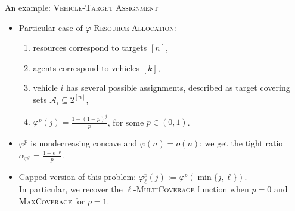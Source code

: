 \documentclass{beamer}
\theoremstyle{definition}
\theoremstyle{remark}
\begin{document}
\begin{frame}{An example: \textsc{Vehicle-Target Assignment}~\cite{Murphey00}}
  \begin{itemize}
  \item Particular case of $\varphi$-\textsc{Resource Allocation}:
    \begin{enumerate}
    \item resources correspond to targets $[n]$,
    \item agents correspond to vehicles $[k]$,
    \item vehicle $i$ has several possible assignments, described as target covering sets $\mathcal{A}_i \subseteq 2^{[n]}$,
    \item $\varphi^p(j) = \frac{1-(1-p)^j}{p}$, for some $p \in (0,1)$.
    \end{enumerate}
    \pause
    \bigskip
  \item $\varphi^p$ is nondecreasing concave and $\varphi(n)=o(n)$: we get the tight ratio $\alpha_{\varphi^p} = \frac{1 - e^{-p}}{p}$.
    \bigskip
  \item Capped version of this problem: $\varphi^p_{\ell}(j) := \varphi^p(\min\{j,\ell\})$.\\In particular, we recover the $\ell$-\textsc{MultiCoverage} function when $p=0$ and \textsc{MaxCoverage} for $p=1$.
  \end{itemize}
  
\end{frame}
\end{document}
